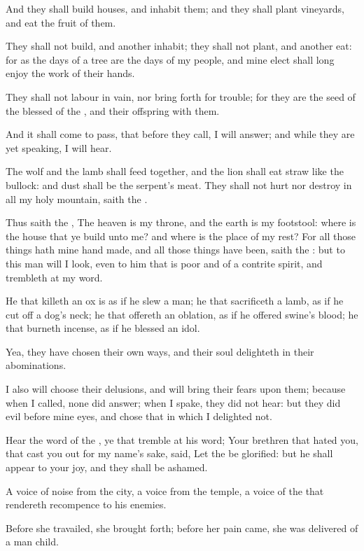 \Verse And they shall build houses, and inhabit them; and they shall plant vineyards, and eat the fruit of them.

\Verse They shall not build, and another inhabit; they shall not plant, and another eat: for as the days of a tree are the days of my people, and mine elect shall long enjoy the work of their hands.

\Verse They shall not labour in vain, nor bring forth for trouble; for they are the seed of the blessed of the \LORD, and their offspring with them.

\Verse And it shall come to pass, that before they call, I will answer; and while they are yet speaking, I will hear.

\Verse The wolf and the lamb shall feed together, and the lion shall eat straw like the bullock: and dust shall be the serpent's meat. They shall not hurt nor destroy in all my holy mountain, saith the \LORD.


\Chapter
\Verse Thus saith the \LORD, The heaven is my throne, and the earth is my footstool: where is the house that ye build unto me? and where is the place of my rest?  \Verse For all those things hath mine hand made, and all those things have been, saith the \LORD: but to this man will I look, even to him that is poor and of a contrite spirit, and trembleth at my word.

\Verse He that killeth an ox is as if he slew a man; he that sacrificeth a lamb, as if he cut off a dog's neck; he that offereth an oblation, as if he offered swine's blood; he that burneth incense, as if he blessed an idol.

Yea, they have chosen their own ways, and their soul delighteth in their abominations.

\Verse I also will choose their delusions, and will bring their fears upon them; because when I called, none did answer; when I spake, they did not hear: but they did evil before mine eyes, and chose that in which I delighted not.

\Verse Hear the word of the \LORD, ye that tremble at his word; Your brethren that hated you, that cast you out for my name's sake, said, Let the \LORD be glorified: but he shall appear to your joy, and they shall be ashamed.

\Verse A voice of noise from the city, a voice from the temple, a voice of the \LORD that rendereth recompence to his enemies.

\Verse Before she travailed, she brought forth; before her pain came, she was delivered of a man child.

